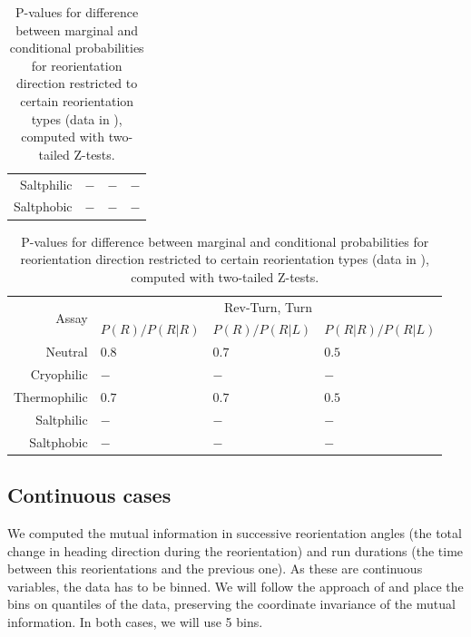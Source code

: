 \documentclass[12pt]{article}
\begin{document}
\begin{table}
\begin{center}
\begin{tabular}{|r|l|l|l|}
    Saltphilic   & $-$ & $-$ & $-$ \\
    Saltphobic   & $-$ & $-$ & $-$ \\
    \hline
  \end{tabular}
  \begin{tabular}{|r|l|l|l|}
    \hline
    \multirow{2}{*}{Assay} & \multicolumn{3}{|c|}{Rev-Turn, Turn} \\
      \cline{2-4}
      & $P(R)/P(R|R)$ & $P(R)/P(R|L)$ & $P(R|R)/P(R|L)$ \\
    \hline
    Neutral      & $0.8$ & $0.7$ & $0.5$ \\
    Cryophilic   & $-$ & $-$ & $-$ \\
    Thermophilic & $0.7$ & $0.7$ & $0.5$ \\
    Saltphilic   & $-$ & $-$ & $-$ \\
    Saltphobic   & $-$ & $-$ & $-$ \\
    \hline
  \end{tabular}
  \end{center}
  \caption[P-values for differences in conditional probabilities for reorientation direction restricted to certain reorientation types]{P-values for difference between marginal and conditional probabilities for reorientation direction restricted to certain reorientation types (data in ), computed with two-tailed Z-tests.}\label{tab:dirvstype}
\end{table}




\subsection{Continuous cases}\label{sec:ctsresults}

We computed the mutual information in successive reorientation angles (the total change in heading direction during the reorientation)  and run durations (the time between this reorientations and the previous one). As these are continuous variables, the data has to be binned. We will follow the approach of \cite{Slonim:2005} and place the bins on quantiles of the data, preserving the coordinate invariance of the mutual information. In both cases, we will use 5 bins.

\end{document}

